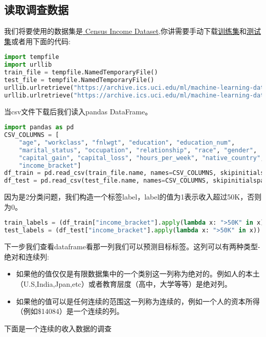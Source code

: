 \subsection{读取调查数据}
我们将要使用的数据集是\href{https://archive.ics.uci.edu/ml/datasets/Census+Income}{ Census Income Dataset},你讲需要手动下载\href{https://archive.ics.uci.edu/ml/machine-learning-databases/adult/adult.data}{训练集}和\href{https://archive.ics.uci.edu/ml/machine-learning-databases/adult/adult.test}{测试集}或者用下面的代码:
\begin{lstlisting}[language=Python]
import tempfile
import urllib
train_file = tempfile.NamedTemporaryFile()
test_file = tempfile.NamedTemporaryFile()
urllib.urlretrieve("https://archive.ics.uci.edu/ml/machine-learning-databases/adult/adult.data", train_file.name)
urllib.urlretrieve("https://archive.ics.uci.edu/ml/machine-learning-databases/adult/adult.test", test_file.name)
\end{lstlisting}
当csv文件下载后我们读入pandas DataFrame。
\begin{lstlisting}[language=Python]
import pandas as pd
CSV_COLUMNS = [
    "age", "workclass", "fnlwgt", "education", "education_num",
    "marital_status", "occupation", "relationship", "race", "gender",
    "capital_gain", "capital_loss", "hours_per_week", "native_country",
    "income_bracket"]
df_train = pd.read_csv(train_file.name, names=CSV_COLUMNS, skipinitialspace=True)
df_test = pd.read_csv(test_file.name, names=CSV_COLUMNS, skipinitialspace=True, skiprows=1)
\end{lstlisting}
因为是2分类问题，我们构造一个标签label，label的值为1表示收入超过50K，否则为0。
\begin{lstlisting}[language=Python]
train_labels = (df_train["income_bracket"].apply(lambda x: ">50K" in x)).astype(int)
test_labels = (df_test["income_bracket"].apply(lambda x: ">50K" in x)).astype(int)
\end{lstlisting}
下一步我们查看dataframe看那一列我们可以预测目标标签。这列可以有两种类型-绝对和连续列:
\begin{itemize}
  \item 如果他的值仅仅是有限数据集中的一个类别这一列称为绝对的。例如人的本土（U.S,India,Jpan,etc）或者教育层度（高中，大学等等）是绝对列。
  \item 如果他的值可以是任何连续的范围这一列称为连续的，例如一个人的资本所得（例如\$14084）是一个连续的列。
\end{itemize}
下面是一个连续的收入数据的调查
